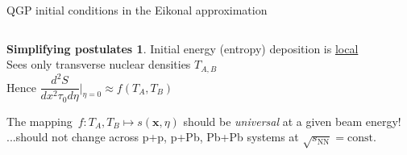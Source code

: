 \documentclass[aspectratio=43]{beamer}
\theoremstyle{definition}
\newtheorem{assertion}{Simplifying postulates}
\begin{document}
\appendix


\begin{frame}{QGP initial conditions in the Eikonal approximation}
  \begin{columns}
    \begin{column}{.8\textwidth}
      \begin{assertion}
        \small Initial energy (entropy) deposition is \underline{local} \\[1ex]
        Sees only transverse nuclear densities $T_{A,B}$ \\[1ex]
        Hence \quad $\dfrac{d^2S}{dx^2\tau_0 d\eta}\Biggr\vert_{\eta=0} \approx f(T_A, T_B)$
      \end{assertion}
      \vspace{.6 cm}
      The mapping\, $f: T_A, T_B \mapsto s(\mathbf{x}, \eta)$ should be \emph{universal} at a given beam energy!\\
      \medskip
      ...should not change across p+p, p+Pb, Pb+Pb systems at $\sqrt{s_\mathrm{NN}} = \text{const}$.
    \end{column}
  \end{columns}
\end{frame}
\end{document}
